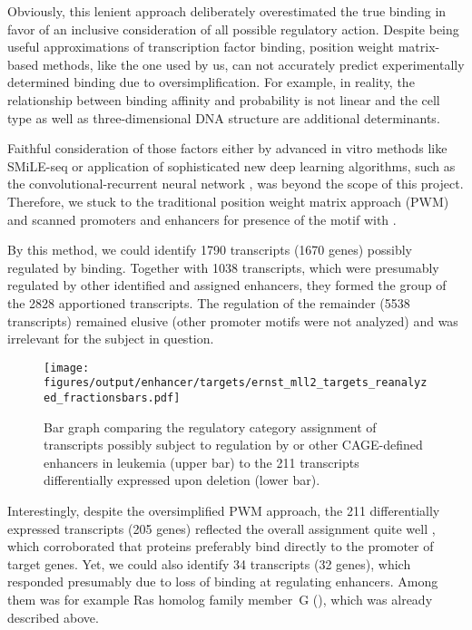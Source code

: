 Obviously, this lenient approach deliberately overestimated the true  binding in favor of an inclusive consideration of all possible regulatory action. Despite being useful approximations of transcription factor binding, position weight matrix-based methods, like the one used by us, can not accurately predict experimentally determined binding due to oversimplification\cite{Jayaram2016}. For example, in reality, the relationship between binding affinity and probability is not linear \cite{Ruan2017} and the cell type \cite{Liu2017a} as well as three-dimensional DNA structure \cite{Yang2015} are additional determinants.

Faithful consideration of those factors either by advanced in vitro methods like SMiLE-seq \cite{Isakova2017} or application of sophisticated new deep learning algorithms\cite{Le2018,Rastogi2018}, such as the convolutional-recurrent neural network \cite{Quang2019}, was beyond the scope of this project. Therefore, we stuck to the traditional position weight matrix approach (PWM) and scanned promoters and enhancers for presence of the motif \motifmlltwo with . 

By this method, we could identify \num{1790} transcripts (\num{1670} genes) possibly regulated by  binding. Together with \num{1038} transcripts, which were presumably regulated by other identified and assigned enhancers, they formed the group of the \num{2828} apportioned transcripts. The regulation of the remainder (\num{5538} transcripts) remained elusive (other promoter motifs were not analyzed) and was irrelevant for the subject in question.
 
\begin{figure}[bht]
	\centering
	\texttt{[image: figures/output/enhancer/targets/ernst\_mll2\_targets\_reanalyzed\_fractionsbars.pdf]} 
	\caption{Bar graph comparing the regulatory category assignment of transcripts possibly subject to regulation by  or other CAGE-defined enhancers in \mllafnine leukemia (upper bar) to the \num{211} transcripts differentially expressed upon  deletion (lower bar).}
	\label{fig:enhancers:ernst_mll2_targets_reanalyzed_fractionsbars}
\end{figure}


Interestingly, despite the oversimplified PWM approach, the \num{211} differentially expressed transcripts (\num{205} genes) reflected the overall assignment quite well , which corroborated that  proteins preferably bind directly to the promoter of target genes\cite{Artinger2013}. Yet, we could also identify \num{34} transcripts (\num{32} genes), which responded presumably due to loss of   binding at regulating enhancers. Among them was for example Ras homolog family member~G (), which was already described above. 

